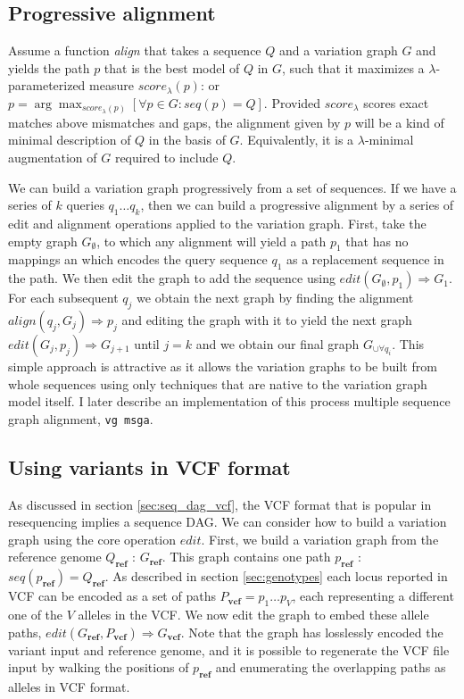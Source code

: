\subsection{Progressive alignment}
Assume a function \emph{align} that takes a sequence $Q$ and a variation graph $G$ and yields the path $p$ that is the best model of $Q$ in $G$, such that it maximizes a $\lambda$-parameterized measure $score_\lambda(p)$: or $p = \arg\max_{score_\lambda(p)} [\forall p \in G : seq(p) = Q]$.
Provided $score_\lambda$ scores exact matches above mismatches and gaps, the alignment given by $p$ will be a kind of minimal description of $Q$ in the basis of $G$.
Equivalently, it is a $\lambda$-minimal augmentation of $G$ required to include $Q$.

We can build a variation graph progressively from a set of sequences.
If we have a series of $k$ queries $q_1 \ldots q_k$, then we can build a progressive alignment by a series of edit and alignment operations applied to the variation graph.
First, take the empty graph $G_\emptyset$, to which any alignment will yield a path $p_1$ that has no mappings an which encodes the query sequence $q_1$ as a replacement sequence in the path.
We then edit the graph to add the sequence using $edit(G_\emptyset, p_1) \Rightarrow G_1$.
For each subsequent $q_j$ we obtain the next graph by finding the alignment $align(q_j, G_j) \Rightarrow p_j$ and editing the graph with it to yield the next graph $edit(G_j, p_j) \Rightarrow G_{j+1}$ until $j = k$ and we obtain our final graph $G_{\cup \forall q_i}$.
This simple approach is attractive as it allows the variation graphs to be built from whole sequences using only techniques that are native to the variation graph model itself.
I later describe an implementation of this process multiple sequence graph alignment, {\tt vg msga}.

\subsection{Using variants in VCF format}
As discussed in section \ref{sec:seq_dag_vcf}, the VCF format that is popular in resequencing implies a sequence DAG.
We can consider how to build a variation graph using the core operation $edit$.
First, we build a variation graph from the reference genome $Q_\textbf{ref}$ : $G_\textbf{ref}$.
This graph contains one path $p_\textbf{ref}$ : $seq(p_\textbf{ref}) = Q_\textbf{ref}$.
As described in section \ref{sec:genotypes} each locus reported in VCF can be encoded as a set of paths $P_\textbf{vcf} = p_1 \ldots p_V$, each representing a different one of the $V$ alleles in the VCF.
We now edit the graph to embed these allele paths, $edit(G_\textbf{ref}, P_\textbf{vcf}) \Rightarrow G_\textbf{vcf}$.
Note that the graph has losslessly encoded the variant input and reference genome, and it is possible to regenerate the VCF file input by walking the positions of $p_\textbf{ref}$ and enumerating the overlapping paths as alleles in VCF format.


